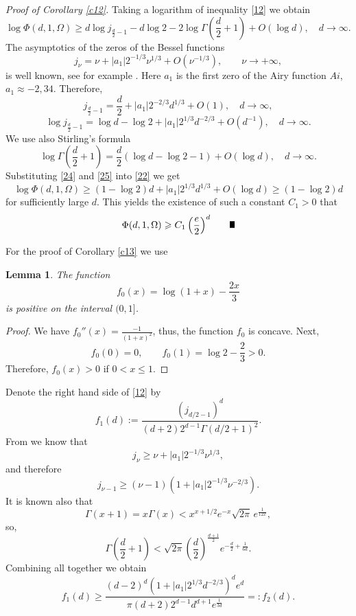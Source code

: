 \documentclass[a4paper,12pt]{article}
\numberwithin{equation}{section}
\def \G{\Gamma}
\def \O{\Omega}
\newcommand{\<}{\langle}
\renewcommand{\>}{\rangle}
\theoremstyle{plain}
\newtheorem{lemma}[theorem]{\bf Lemma}
\theoremstyle{definition}
\theoremstyle{remark}
\renewcommand{\le}{\leqslant}
\renewcommand{\ge}{\geqslant}
\renewcommand{\qed}{\vrule height7pt width5pt depth0pt}
\begin{document}
{\it Proof of Corollary \ref{c12}.}
Taking a logarithm of inequality \eqref{12} we obtain 
\begin{equation}
\label{22}
\log \Phi (d,1,\O) \ge d \log j_{\frac{d}2-1} - d \log 2 - 2 \log \G\left(\frac{d}2 + 1\right)
+ O (\log d), \quad d \to \infty.
\end{equation}
The asymptotics of the zeros of the Bessel functions 
$$
j_\nu = \nu + |a_1| 2^{-1/3} \nu^{1/3} + O \left(\nu^{-1/3}\right), 
\qquad \nu \to + \infty,
$$
is well known, see for example \cite{QuWong}.
Here $a_1$ is the first zero of the Airy function $Ai$, $a_1 \approx - 2,34$.
Therefore,
\begin{equation}
\label{23}
j_{\frac{d}2-1} = \frac{d}2 + |a_1| 2^{-2/3} d^{1/3} + O(1), \quad d \to \infty,
\end{equation}
\begin{equation}
\label{24}
\log j_{\frac{d}2-1} = \log d - \log 2 + |a_1| 2^{1/3} d^{-2/3} + O(d^{-1}),
\quad d \to \infty.
\end{equation}
We use also Stirling's formula 
\begin{equation}
\label{25}
\log \G\left(\frac{d}2 + 1\right)
= \frac{d}2 \left(\log d - \log 2 - 1\right) + O(\log d), \quad d \to \infty.
\end{equation}
Substituting \eqref{24} and \eqref{25} into \eqref{22} we get
$$
\log \Phi (d,1,\O) \ge 
(1 - \log 2) d + |a_1| 2^{1/3} d^{1/3} + O(\log d)
\ge (1 - \log 2) d
$$
for sufficiently large $d$.
This yields the existence of such a constant $C_1 > 0$ that
$$
\Phi (d,1,\O) \ge C_1 \left(\frac{e}2\right)^d \qquad \qed
$$

For the proof of Corollary \ref{c13} we use

\begin{lemma}
\label{l21}
The function
$$
f_0 (x) = \log (1+x) - \frac{2x}3
$$
is positive on the interval $(0,1]$.
\end{lemma}

\begin{proof}
We have $f_0''(x) = \frac{-1}{(1+x)^2}$, thus, 
the function $f_0$ is concave.
Next, 
$$
f_0 (0) = 0, \qquad f_0(1) = \log 2 - \frac23 > 0 .
$$
Therefore,
$f_0(x) > 0$ if $0<x \le 1$.
\end{proof}

Denote the right hand side of \eqref{12} by
$$
f_1 (d) := \frac{(j_{d/2-1})^d}{(d+2) 2^{d-1} \G(d/2+1)^2}.
$$
From \cite{QuWong} we know that
$$
j_\nu \ge \nu + |a_1| 2^{-1/3} \nu^{1/3} ,
$$
and therefore
$$
j_{\nu-1} \ge (\nu - 1) \left(1  + |a_1| 2^{-1/3} \nu^{-2/3}\right).
$$ 
It is known also that
$$
\G (x+1) = x \G(x) < x^{x+1/2} e^{-x} \sqrt{2\pi} \,e^{\frac1{12x}},
$$
so,
$$
\G\left(\frac{d}2+1\right) < 
\sqrt{2\pi} \left(\frac{d}2\right)^{\frac{d+1}2} e^{-\frac{d}2 + \frac1{6d}}.
$$
Combining all together we obtain
$$
f_1(d) \ge \frac{(d-2)^d \left(1 + |a_1|2^{1/3} d^{-2/3}\right)^d e^d}
{\pi (d+2) 2^{d-1} d^{d+1} e^{\frac1{3d}}} =: f_2 (d).
$$
\end{document}
